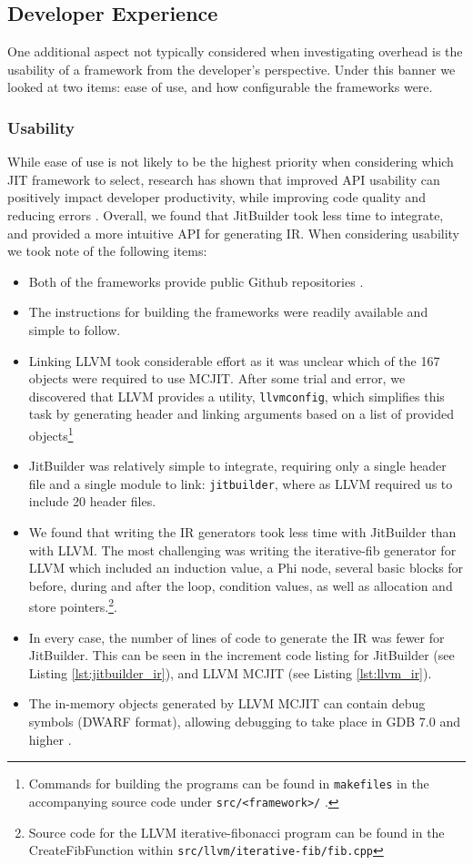 \subsection{Developer Experience}
One additional aspect not typically considered when investigating overhead is the usability of a framework from the developer’s perspective. Under this banner we looked at two items: ease of use, and how configurable the frameworks were.

\subsubsection{Usability}
While ease of use is not likely to be the highest priority when considering which JIT framework to select, research has shown that improved API usability can positively impact developer productivity, while improving code quality and reducing errors \cite{apiUsability}.
Overall, we found that JitBuilder took less time to integrate, and provided a more intuitive API for generating IR.
When considering usability we took note of the following items:
\begin{itemize}
  \item Both of the frameworks provide public Github repositories \cite{llvmGithub,jitbuilderGithub}.
  \item The instructions for building the frameworks were readily available and simple to follow.
  \item Linking LLVM took considerable effort as it was unclear which of the 167 objects were required to use MCJIT. 
  After some trial and error, we discovered that LLVM provides a utility, \texttt{llvmconfig}, which simplifies this task by generating header and linking arguments based on a list of provided objects\footnote{Commands for building the programs can be found in \texttt{makefiles} in the accompanying source code under \texttt{src/<framework>/} \cite{projectGithub}.} 
  \item JitBuilder was relatively simple to integrate, requiring only a single header file and a single module to link: \texttt{jitbuilder}, where as LLVM required us to include 20 header files.
  \item We found that writing the IR generators took less time with JitBuilder than with LLVM. 
  The most challenging was writing the iterative-fib generator for LLVM which included an induction value, a Phi node, several basic blocks for before, during and after the loop, condition values, as well as allocation and store pointers.\footnote{Source code for the LLVM iterative-fibonacci program can be found in the CreateFibFunction within \texttt{src/llvm/iterative-fib/fib.cpp}}.
  \item In every case, the number of lines of code to generate the IR was fewer for JitBuilder. 
  This can be seen in the increment code listing for JitBuilder (see Listing \ref{lst:jitbuilder_ir}), and LLVM MCJIT (see Listing \ref{lst:llvm_ir}).
  \item The in-memory objects generated by LLVM MCJIT can contain debug symbols (DWARF format), allowing debugging to take place in GDB 7.0 and higher \cite{llvmDebugJIT}.
\end{itemize}

